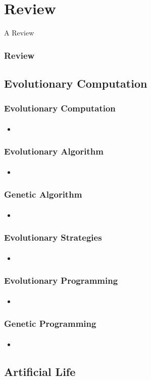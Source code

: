 \section{Review}

\frame
{
	\begin{center}
		\LARGE A Review
	\end{center}
}

\frame
{
	\frametitle{Review}
}

\subsection{Evolutionary Computation}

\frame
{
	\frametitle{Evolutionary Computation}
	\framesubtitle{}

	\begin{itemize}
		\item 
	\end{itemize}
}

\frame
{
	\frametitle{Evolutionary Algorithm}
	\framesubtitle{}

	\begin{itemize}
		\item 
	\end{itemize}
}

\frame
{
	\frametitle{Genetic Algorithm}
	\framesubtitle{}

	\begin{itemize}
		\item 
	\end{itemize}
}

\frame
{
	\frametitle{Evolutionary Strategies}
	\framesubtitle{}

	\begin{itemize}
		\item 
	\end{itemize}
}

\frame
{
	\frametitle{Evolutionary Programming}
	\framesubtitle{}

	\begin{itemize}
		\item 
	\end{itemize}
}

\frame
{
	\frametitle{Genetic Programming}
	\framesubtitle{}

	\begin{itemize}
		\item 
	\end{itemize}
}

\subsection{Artificial Life}

